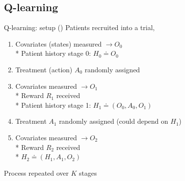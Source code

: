 \documentclass[handout]{beamer}
\begin{document}
\subsection{Q-learning} %
\label{sub:q_learning}

\begin{frame}{Q-learning: setup (\cite{dtr-review})}
  Patients recruited into a trial,
  \begin{enumerate}[<+(1)->]
    \item Covariates (states) measured $\rightarrow O_{0}$ \\*
    Patient history stage 0: $H_{0} \doteq O_{0}$
    \item Treatment (action) $A_{0}$ randomly assigned
    \item Covariates measured $\rightarrow O_{1}$ \\*
    Reward $R_{1}$ received \\*
    Patient history stage 1: $H_{1} \doteq (O_{0}, A_{0}, O_{1})$
    \item Treatment $A_{1}$ randomly assigned (could depend on $H_{1}$)
    \item Covariates measured $\rightarrow O_{2}$ \\*
    Reward $R_{2}$ received \\*
    $H_{2} \doteq (H_{1}, A_{1}, O_{2})$
  \end{enumerate}
    \pause
    Process repeated over $K$ stages
\end{frame}
\end{document}
